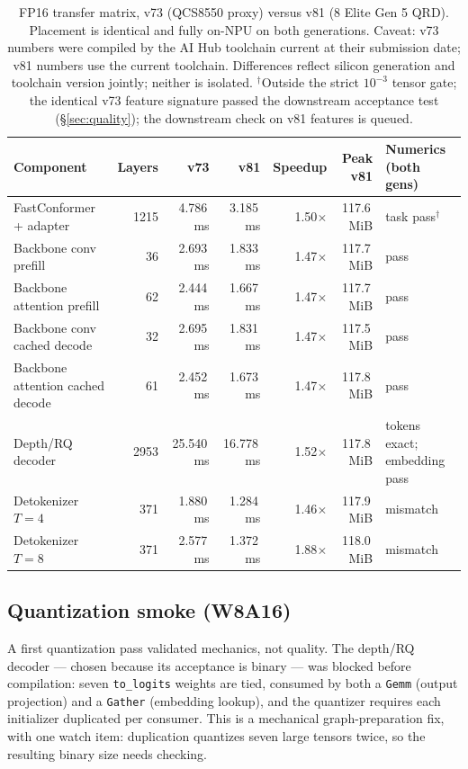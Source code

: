 \documentclass[10pt,twocolumn,letterpaper]{article}
\begin{document}
\begin{table}[t]
\centering
\small
\caption{FP16 transfer matrix, v73 (QCS8550 proxy) versus v81 (8 Elite Gen 5
QRD). Placement is identical and fully on-NPU on both generations. Caveat:
v73 numbers were compiled by the AI Hub toolchain current at their submission
date; v81 numbers use the current toolchain. Differences reflect silicon
generation and toolchain version jointly; neither is isolated.
$^{\dagger}$Outside the strict $10^{-3}$ tensor gate; the identical v73
feature signature passed the downstream acceptance test (\S\ref{sec:quality});
the downstream check on v81 features is queued.}
\label{tab:v81}
\begin{tabular}{@{}lrrrrrl@{}}
\toprule
\textbf{Component} & \textbf{Layers} & \textbf{v73} & \textbf{v81} & \textbf{Speedup} & \textbf{Peak v81} & \textbf{Numerics (both gens)} \\
\midrule
FastConformer + adapter & 1215 & 4.786\,ms & 3.185\,ms & 1.50$\times$ & 117.6\,MiB & task pass$^{\dagger}$ \\
Backbone conv prefill & 36 & 2.693\,ms & 1.833\,ms & 1.47$\times$ & 117.7\,MiB & pass \\
Backbone attention prefill & 62 & 2.444\,ms & 1.667\,ms & 1.47$\times$ & 117.7\,MiB & pass \\
Backbone conv cached decode & 32 & 2.695\,ms & 1.831\,ms & 1.47$\times$ & 117.5\,MiB & pass \\
Backbone attention cached decode & 61 & 2.452\,ms & 1.673\,ms & 1.47$\times$ & 117.8\,MiB & pass \\
Depth/RQ decoder & 2953 & 25.540\,ms & 16.778\,ms & 1.52$\times$ & 117.8\,MiB & tokens exact; embedding pass \\
Detokenizer $T{=}4$ & 371 & 1.880\,ms & 1.284\,ms & 1.46$\times$ & 117.9\,MiB & mismatch \\
Detokenizer $T{=}8$ & 371 & 2.577\,ms & 1.372\,ms & 1.88$\times$ & 118.0\,MiB & mismatch \\
\bottomrule
\end{tabular}
\end{table}

\subsection{Quantization smoke (W8A16)}

A first quantization pass validated mechanics, not quality. The depth/RQ
decoder --- chosen because its acceptance is binary --- was blocked before
compilation: seven \texttt{to\_logits} weights are tied, consumed by both a
\texttt{Gemm} (output projection) and a \texttt{Gather} (embedding lookup),
and the quantizer requires each initializer duplicated per consumer. This is a
mechanical graph-preparation fix, with one watch item: duplication quantizes
seven large tensors twice, so the resulting binary size needs checking.
\end{document}
